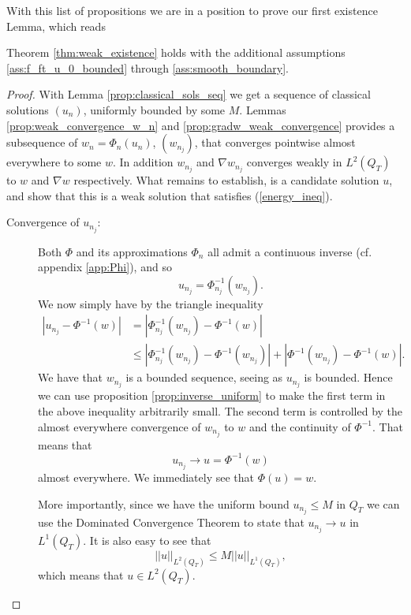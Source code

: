 \documentclass[11pt, a4paper]{article}
\begin{document}
With this list of propositions we are in a position to prove our first existence Lemma, which reads
\begin{lemma}
\label{lem:existence_part1}
Theorem \ref{thm:weak_existence} holds with the additional assumptions \ref{ass:f_ft_u_0_bounded} through \ref{ass:smooth_boundary}.
\end{lemma}

\begin{proof}
With Lemma \ref{prop:classical_sols_seq} we get a sequence of classical solutions $(u_n)$, uniformly bounded by some $M$. Lemmas \ref{prop:weak_convergence_w_n} and \ref{prop:gradw_weak_convergence} provides a subsequence of $w_n = \Phi_n(u_n)$, $(w_{n_j})$, that converges pointwise almost everywhere to some $w$. In addition $w_{n_j}$ and $\nabla w_{n_j}$ converges weakly in $L^2(Q_T)$ to $w$ and $\nabla w$ respectively. What remains to establish, is a candidate solution $u$, and show that this is a weak solution that satisfies (\ref{energy_ineq}).

\begin{description}
	\item[Convergence of $u_{n_j}$:] Both $\Phi$ and its approximations $\Phi_n$ all admit a continuous inverse (cf. appendix \ref{app:Phi}), and so
	\begin{equation*}
	u_{n_j} = \Phi_{n_j}^{-1}(w_{n_j}).
	\end{equation*}
	We now simply have by the triangle inequality
	\begin{align*}
	|u_{n_j} - \Phi^{-1}(w)| &= |\Phi_{n_j}^{-1}(w_{n_j}) - \Phi^{-1}(w)| \\
		&\leq |\Phi_{n_j}^{-1}(w_{n_j}) - \Phi^{-1}(w_{n_j})| + |\Phi^{-1}(w_{n_j}) - \Phi^{-1}(w)|.
	\end{align*}
	 We have that $w_{n_j}$ is a bounded sequence, seeing as $u_{n_j}$ is bounded. Hence we can use proposition \ref{prop:inverse_uniform} to make the first term in the above inequality arbitrarily small. The second term is controlled by the almost everywhere convergence of $w_{n_j}$ to $w$ and the continuity of $\Phi^{-1}$. That means that
	 \begin{equation*}
	 u_{n_j} \to u = \Phi^{-1}(w)
	 \end{equation*}
	 almost everywhere. We immediately see that $\Phi(u) = w$.
	 
	 More importantly, since we have the uniform bound $u_{n_j} \leq M$ in $Q_T$ we can use the Dominated Convergence Theorem to state that $u_{n_j} \to u$ in $L^1(Q_T)$.
	 It is also easy to see that
	 \begin{equation}
	 ||u||_{L^2(Q_T)} \leq M||u||_{L^1(Q_T)},
	 \end{equation}
	 which means that $u \in L^2(Q_T)$.
	

\end{description}
\end{proof}
\end{document}
